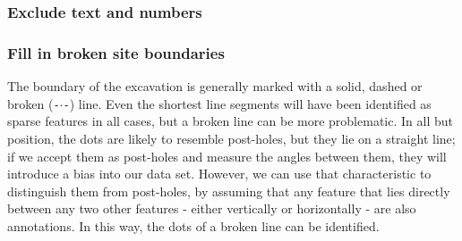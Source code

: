 \documentclass[../../ArchStats.tex]{subfiles}
\begin{document}
\subsubsection{Exclude text and numbers}
\label{sec:closing}



\subsubsection{Fill in broken site boundaries}
\label{sec:site-boundaries}
The boundary of the excavation is generally marked with a solid, dashed or broken (\texttt{-$\cdot$-}) line. Even the shortest line segments will have been identified as sparse features in all cases, but a broken line can be more problematic. In all but position, the dots are likely to resemble post-holes, but they lie on a straight line; if we accept them as post-holes and measure the angles between them, they will introduce a bias into our data set. However, we can use that characteristic to distinguish them from post-holes, by assuming that any feature that lies directly between any two other features - either vertically or horizontally - are also annotations. In this way, the dots of a broken line can be identified. %
\end{document}
